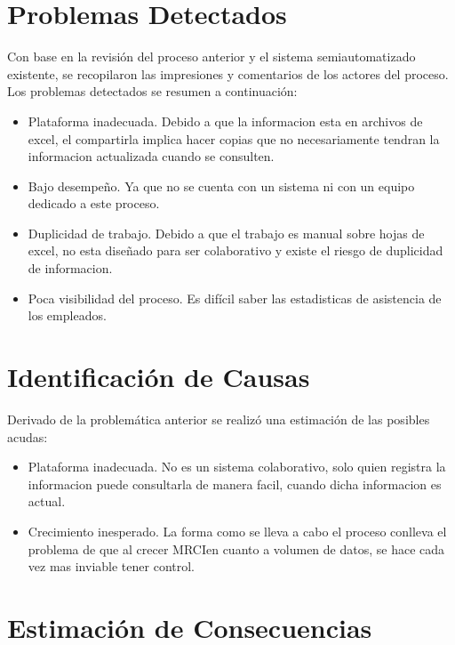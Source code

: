 \documentclass[10pt]{book}
\newcommand{\cliente}{MRCI}
\begin{document}
\section{Problemas Detectados}
	
	Con base en la revisión del proceso anterior y el sistema semiautomatizado existente, se recopilaron las impresiones y comentarios de los actores del proceso. Los problemas detectados se resumen a continuación:
	
	\begin{itemize}
		\item Plataforma inadecuada. Debido a que la informacion esta en archivos de excel, el compartirla implica hacer copias que no necesariamente tendran la informacion actualizada cuando se consulten.
		\item Bajo desempeño. Ya que no se cuenta con un sistema ni con un equipo dedicado a este proceso.
		\item Duplicidad de trabajo. Debido a que el trabajo es manual sobre hojas de excel, no esta diseñado para ser colaborativo y existe el riesgo de duplicidad de informacion.
		\item Poca visibilidad del proceso. Es difícil saber las estadisticas de asistencia de los empleados.
	\end{itemize}

\section{Identificación de Causas}

Derivado de la problemática anterior se realizó una estimación de las posibles acudas:

\begin{itemize}	
	\item Plataforma inadecuada. No es un sistema colaborativo, solo quien registra la informacion puede consultarla de manera facil, cuando dicha informacion es actual.
	\item Crecimiento inesperado. La forma como se lleva a cabo el proceso conlleva el problema de que al crecer \cliente en cuanto a volumen de datos, se hace cada vez mas inviable tener control.
\end{itemize}

\section{Estimación de Consecuencias}
\end{document}

